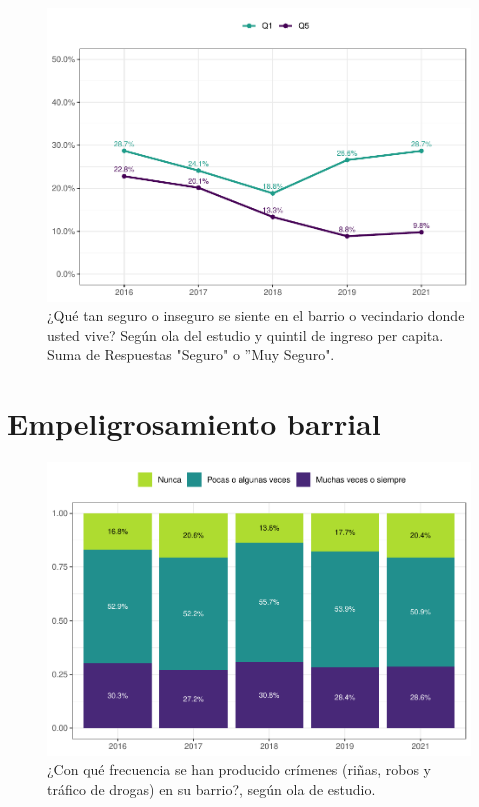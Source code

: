 \documentclass[
  12pt,
  openany]{book}
\begin{document}
\begin{figure}

{\centering \includegraphics{reporte-elsoc_files/figure-latex/seguri-quintil-1} 

}

\caption{¿Qué tan seguro o inseguro se siente en el barrio o vecindario donde usted vive? Según ola del estudio y quintil de ingreso per capita. Suma de Respuestas "Seguro" o ”Muy Seguro".}\label{fig:seguri-quintil}
\end{figure}

\hypertarget{empeligrosamiento-barrial}{%
\section{Empeligrosamiento barrial}\label{empeligrosamiento-barrial}}

\begin{figure}

{\centering \includegraphics{reporte-elsoc_files/figure-latex/crim-olas-1} 

}

\caption{¿Con qué frecuencia se han producido crímenes (riñas, robos y tráfico de drogas) en su barrio?, según ola de estudio.}\label{fig:crim-olas}
\end{figure}
\end{document}
